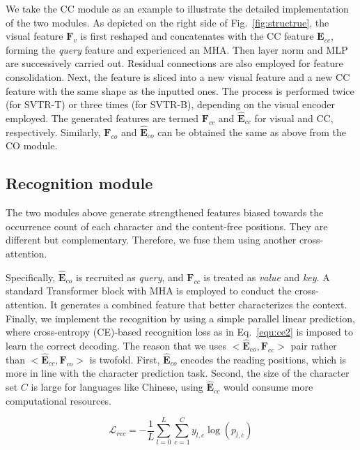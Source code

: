 \documentclass[10pt,journal,compsoc]{IEEEtran}
\begin{document}
We take the CC module as an example to illustrate the detailed implementation of the two modules. As depicted on the right side of Fig.~\ref{fig:structrue}, the visual feature $\mathbf{F}_v$ is first reshaped and concatenates with the CC feature $\mathbf{E}_{cc}$, forming the \emph{query} feature and experienced an MHA. Then layer norm and MLP are successively carried out. Residual connections are also employed for feature consolidation. Next, the feature is sliced into a new visual feature and a new CC feature with the same shape as the inputted ones. The process is performed twice (for SVTR-T) or three times (for SVTR-B), depending on the visual encoder employed. The generated features are termed $\mathbf{F}_{cc}$ and $\mathbf{\hat{E}}_{cc}$ for visual and CC, respectively. Similarly, $\mathbf{F}_{co}$ and $\mathbf{\hat{E}}_{co}$ can be obtained the same as above from the CO module.

\subsection{Recognition module}
The two modules above generate strengthened features biased towards the occurrence count of each character and the content-free positions. They are different but complementary. Therefore, we fuse them using another cross-attention.

Specifically, $\mathbf{\hat{E}}_{co}$ is recruited as \emph{query}, and $\mathbf{F}_{cc}$ is treated as \emph{value} and \emph{key}. A standard Transformer block with MHA is employed to conduct the cross-attention. It generates a combined feature that better characterizes the context. Finally, we implement the recognition by using a simple parallel linear prediction, where cross-entropy (CE)-based recognition loss as in Eq.~\ref{equ:ce2} is imposed to learn the correct decoding. The reason that we uses $<\mathbf{\hat{E}}_{co},\mathbf{F}_{cc}>$ pair rather than $<\mathbf{\hat{E}}_{cc},\mathbf{F}_{co}>$ is twofold. First, $\mathbf{\hat{E}}_{co}$ encodes the reading positions, which is more in line with the character prediction task. Second, the size of the character set $C$ is large for languages like Chinese, using $\mathbf{\hat{E}}_{cc}$ would consume more computational resources. 

\begin{equation}
\mathcal{L}_{rec} =  -\frac{1}{L}\sum_{l=0}^{L}\sum_{c=1}^Cy_{l,c}\log(p_{l,c})
\label{equ:ce2}
\end{equation}
\end{document}
